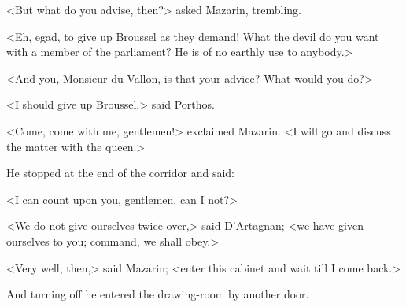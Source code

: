<But what do you advise, then?> asked Mazarin, trembling.

<Eh, egad, to give up Broussel as they demand! What the devil do you want with a member of the parliament? He is of no earthly use to anybody.>

<And you, Monsieur du Vallon, is that your advice? What would you do?>

<I should give up Broussel,> said Porthos.

<Come, come with me, gentlemen!> exclaimed Mazarin. <I will go and discuss the matter with the queen.>

He stopped at the end of the corridor and said:

<I can count upon you, gentlemen, can I not?>

<We do not give ourselves twice over,> said D'Artagnan; <we have given ourselves to you; command, we shall obey.>

<Very well, then,> said Mazarin; <enter this cabinet and wait till I come back.>

And turning off he entered the drawing-room by another door. 